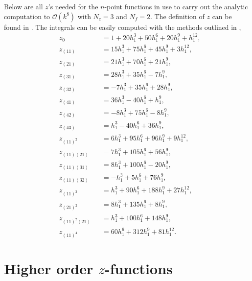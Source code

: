 Below are all $z$'s needed for the $n$-point functions in use to carry out the
analytic computation to $\mathcal{O}(k^8)$ with $N_c = 3$ and $N_f = 2$. The
definition of $z$ can be found in . The integrals
can be easily computed with the methods outlined in ,
%
\begin{subequations}
\begin{alignat}{4}
  &z_0 &&= 1 + 20 h_1^3 + 50 h_1^6 + 20 h_1^9 + h_1^{12}, \\
  &z_{(11)} &&= 15 h_1^3 + 75 h_1^6 + 45 h_1^9 + 3 h_1^{12}, \\
  &z_{(21)} &&= 21 h_1^3 + 70 h_1^6 + 21 h_1^9, \\
  &z_{(31)} &&= 28 h_1^3 + 35 h_1^6 - 7 h_1^9, \\
  &z_{(32)} &&= -7 h_1^3 + 35 h_1^6 + 28 h_1^9, \\
  &z_{(41)} &&= 36 h_1^3 - 40 h_1^6 + h_1^9, \\
  &z_{(42)} &&= -8 h_1^3 + 75 h_1^6 - 8 h_1^9, \\
  &z_{(43)} &&= h_1^3 - 40 h_1^6 + 36 h_1^9, \\
  &z_{(11)^2} &&= 6 h_1^3 + 95 h_1^6 + 96 h_1^9 + 9 h_1^{12}, \\
  &z_{(11)(21)} &&= 7 h_1^3 + 105 h_1^6 + 56 h_1^9, \\
  &z_{(11)(31)} &&= 8 h_1^3 + 100 h_1^6 - 20 h_1^9, \\
  &z_{(11)(32)} &&= -h_1^3 + 5 h_1^6 + 76 h_1^9, \\
  &z_{(11)^3} &&= h_1^3 + 90 h_1^6 + 188 h_1^9 + 27 h_1^{12}, \\
  &z_{(21)^2} &&= 8 h_1^3 + 135 h_1^6 + 8 h_1^9, \\
  &z_{(11)^2(21)} &&= h_1^3 + 100 h_1^6 + 148 h_1^9, \\
  &z_{(11)^4} &&= 60 h_1^6 + 312 h_1^9 + 81 h_1^{12}.
\end{alignat}
\end{subequations}


\section{Higher order \texorpdfstring{$z$}{z}-functions}

